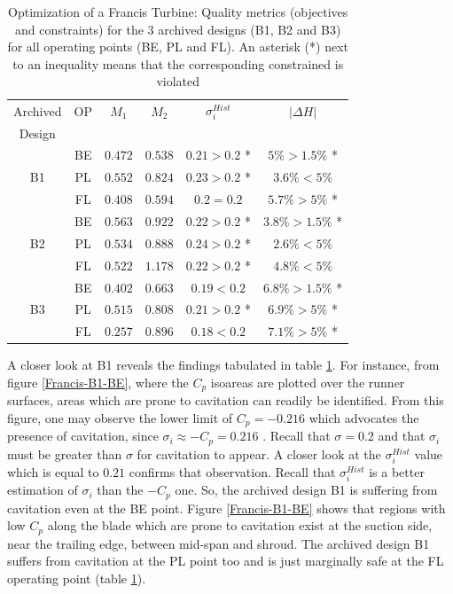 \begin{table}[h!]
\begin{center}
\begin{tabular}{ |c|c|c|c|c|c| }
\hline
Archived & OP & $M_1$ & $M_2$  & $\sigma_i^{Hist}$ & $|\Delta H|$\\
Design &&&&&\\
\hline
 & BE & $0.472$ & $0.538$ & $0.21 > 0.2$ * & $ 5\% >1.5\%$ * \\
B1 & PL & $0.552$ & $0.824$ & $0.23 > 0.2$ * & $ 3.6\% <5\%$ \\
& FL & $0.408$ & $0.594$ & $0.2 = 0.2$  & $ 5.7\% >5\%$ * \\
\hline
\hline
& BE & $0.563$ & $0.922$ & $0.22 > 0.2$ * & $ 3.8\% >1.5\%$ * \\
B2 & PL & $0.534$ & $0.888$ & $0.24 > 0.2$ * & $ 2.6\% <5\%$  \\
& FL & $0.522$ & $1.178$ & $0.22 > 0.2$ * & $ 4.8\% <5\%$  \\
\hline
\hline
& BE & $0.402$ & $0.663$ & $0.19 < 0.2$  & $ 6.8\% >1.5\%$ * \\
B3 & PL & $0.515$ & $0.808$ & $0.21 > 0.2$ * & $ 6.9\% >5\%$ * \\
& FL & $0.257$ & $0.896$ & $0.18 < 0.2$  & $ 7.1\% >5\%$ * \\
\hline
\end{tabular}
\caption{Optimization of a Francis Turbine: Quality metrics (objectives and constraints) for the 3 archived designs (B1, B2 and B3) for all operating points (BE, PL and FL). An asterisk (*) next to an inequality means that the corresponding constrained is violated}
\label{reuse}
\end{center}
\end{table}

A closer look at B1 reveals the findings tabulated in table \ref{reuse}. For instance, from figure \ref{Francis-B1-BE}, where the  $C_p$ isoareas are plotted over the runner surfaces, areas which are prone to cavitation can readily be identified. From this figure, one may observe the lower limit of $C_p = -0.216$ which advocates the presence of cavitation, since $\sigma_i \approx -C_p=0.216$  . Recall that $\sigma=0.2$ and that $\sigma_i$ must be greater than $\sigma$ for cavitation to appear. A closer look at the $\sigma_i^{Hist}$ value which is equal to $0.21$ confirms that observation. Recall that $\sigma_i^{Hist}$ is a better estimation of $\sigma_i$ than the $-C_p$ one. So, the archived design B1 is suffering from cavitation even at the BE point. Figure \ref{Francis-B1-BE} shows that regions with low $C_p$ along the blade which are prone to cavitation exist at the suction side, near the trailing edge, between mid-span and shroud. The archived design B1 suffers from cavitation at the PL point too and is just marginally safe at the FL operating point (table \ref{reuse}). 

